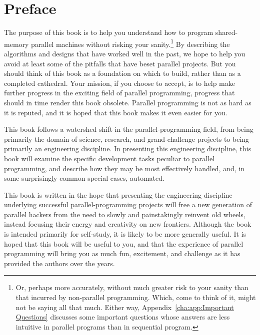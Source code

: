
\chapter*{Preface}

The purpose of this book is to help you understand how to program
shared-memory parallel machines without risking your sanity.\footnote{
	Or, perhaps more accurately, without much greater risk to your
	sanity than that incurred by non-parallel programming.
	Which, come to think of it, might not be saying all that much.
	Either way, Appendix~\ref{cha:app:Important Questions} discusses
	some important questions whose answers are less intuitive in
	parallel programs than in sequential program.}
By describing the algorithms and designs that have worked well in
the past, we hope to help you avoid at least some of the pitfalls
that have beset parallel projects.
But you should think of this book as a foundation on which to build,
rather than as a completed cathedral.
Your mission, if you choose to accept, is to help make further progress
in the exciting field of parallel programming, progress that should
in time render this book obsolete.
Parallel programming is not as hard as it is reputed, and it is hoped
that this book makes it even easier for you.

This book follows a watershed shift in the parallel-programming field,
from being primarily the domain of science, research, and grand-challenge
projects to being primarily an engineering discipline.
In presenting this engineering discipline, this book will examine
the specific development tasks peculiar to parallel programming,
and describe how they may be most effectively handled, and, in some
surprisingly common special cases, automated.

This book is written in the hope that presenting the engineering
discipline underlying successful
parallel-programming projects will free a new generation of parallel hackers
from the need to slowly and painstakingly reinvent old wheels, instead
focusing their energy and creativity on new frontiers.
Although the book is intended primarily for self-study, it is likely
to be more generally useful.
It is hoped that this book will be useful to you, and that the experience
of parallel programming will bring you as much fun, excitement, and
challenge as it has provided the authors over the years.

